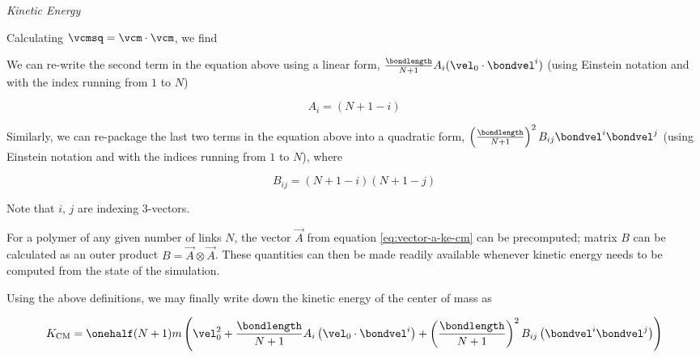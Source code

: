 \emph{Kinetic Energy}
\label{sec:calculation-kinetic-energy-cm-ke}
  \par Calculating $\vcmsq = \vcm \cdot \vcm$, we find
  
  \par We can re-write the second term in the equation above using a linear form, $\frac{\bondlength}{N+1} A_{i} (\vel_{0} \cdot \bondvel^{i})$ (using Einstein notation and with the index running from $1$ to $N$)
  \begin{tcolorbox}
    \begin{equation}
    \label{eq:vector-a-ke-cm}
      A_{i} = (N + 1 - i)
    \end{equation}
  \end{tcolorbox}
  \par Similarly, we can re-package the last two terms in the equation above into a quadratic form, $\left(\frac{\bondlength}{N+1}\right)^2 B_{ij} \bondvel^{i} \bondvel^{j}$ (using Einstein notation and with the indices running from $1$ to $N$), where
  \begin{tcolorbox}
    \begin{equation}
    \label{eq:matrix-ke-cm}
      B_{ij} = (N + 1 - i) (N + 1 - j)
    \end{equation}
  \end{tcolorbox}
  Note that $i$, $j$ are indexing 3-vectors.
  \par For a polymer of any given number of links $N$, the vector $\vec{A}$ from equation \ref{eq:vector-a-ke-cm} can be precomputed; matrix $B$ can be calculated as an outer product $B = \vec{A} \otimes \vec{A}$. These quantities can then be made readily available whenever kinetic energy needs to be computed from the state of the simulation.
  \par Using the above definitions, we may finally write down the kinetic energy of the center of mass as
  \begin{tcolorbox}
    \begin{equation}
    \label{eq:k-cm}
        K_{\textrm{CM}} = \onehalf (N+1)m
          \left(
            \vel^2_{0}
              + \frac{\bondlength}{N+1}
                  A_{i} \left(\vel_{0} \cdot \bondvel^{i}\right)
              + \left(\frac{\bondlength}{N+1}\right)^2
                B_{ij} \left(\bondvel^{i} \bondvel^{j}\right)
          \right)
    \end{equation}
  \end{tcolorbox}
